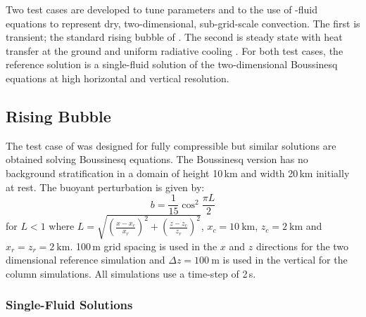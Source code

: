 \documentclass[draft]{agujournal2019}
\begin{document}
Two test cases are developed to tune parameters and to  the
use of -fluid equations to represent dry, two-dimensional, sub-grid-scale
convection. The first is transient; the standard rising bubble of
.  The second  is steady state with heat transfer at
the ground and uniform radiative cooling . For both test cases, the
reference solution is a single-fluid solution of the two-dimensional
Boussinesq equations at high horizontal and vertical resolution. 

\subsection{Rising Bubble}

The  test case of  was designed for fully compressible
 but similar solutions are obtained solving Boussinesq equations.
The Boussinesq version has no background stratification in a domain
of height 10\,km and width 20\,km initially at rest. The buoyant
perturbation is given by:
\begin{equation}
b=\frac{1}{15}\cos^{2}\frac{\pi L}{2}\label{eq:thetaPerturb}
\end{equation}
for $L<1$ where $L=\sqrt{\left(\frac{x-x_{c}}{x_{r}}\right)^{2}+\left(\frac{z-z_{c}}{z_{r}}\right)^{2}}$,
$x_{c}=10\ \text{km}$, $z_{c}=2\ \text{km}$ and $x_{r}=z_{r}=2\ \text{km}$.
100\,m grid spacing is used in the $x$ and $z$ directions for the
two dimensional reference simulation and $\Delta z=100\ \text{m}$
is used in the vertical for the  column simulations. All simulations
use a time-step of 2\,s.

\subsubsection{Single-Fluid Solutions}
\end{document}
